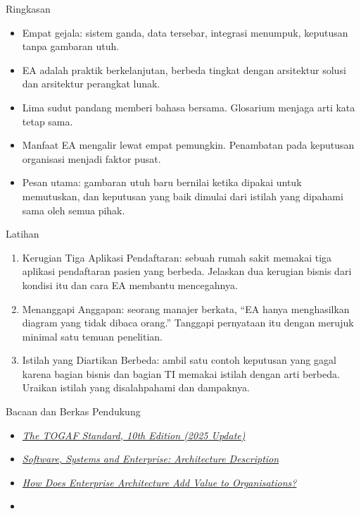 \documentclass[aspectratio=169, table, 12pt]{beamer}
\begin{document}
\begin{frame}{{\Large Ringkasan}}
  \vspace{6pt}
  \small
  \begin{itemize}
    \item Empat gejala: sistem ganda, data tersebar, integrasi menumpuk, keputusan tanpa gambaran utuh.
    \item EA adalah praktik berkelanjutan, berbeda tingkat dengan arsitektur solusi dan arsitektur
          perangkat lunak.
    \item Lima sudut pandang memberi bahasa bersama. Glosarium menjaga arti kata tetap sama.
    \item Manfaat EA mengalir lewat empat pemungkin. Penambatan pada keputusan organisasi menjadi
          faktor pusat.
    \item Pesan utama: gambaran utuh baru bernilai ketika dipakai untuk memutuskan, dan keputusan yang
          baik dimulai dari istilah yang dipahami sama oleh semua pihak.
  \end{itemize}
\end{frame}

\begin{frame}{{\Large Latihan}}
  \vspace{6pt}
  \small
  \begin{enumerate}
    \item Kerugian Tiga Aplikasi Pendaftaran: sebuah rumah sakit memakai tiga aplikasi pendaftaran
          pasien yang berbeda. Jelaskan dua kerugian bisnis dari kondisi itu dan cara EA membantu
          mencegahnya.
    \item Menanggapi Anggapan: seorang manajer berkata, ``EA hanya menghasilkan diagram yang tidak
          dibaca orang.'' Tanggapi pernyataan itu dengan merujuk minimal satu temuan penelitian.
    \item Istilah yang Diartikan Berbeda: ambil satu contoh keputusan yang gagal karena bagian bisnis
          dan bagian TI memakai istilah dengan arti berbeda. Uraikan istilah yang disalahpahami dan
          dampaknya.
  \end{enumerate}
\end{frame}

\begin{frame}{{\Large Bacaan dan Berkas Pendukung}}
  \vspace{10pt}
  \begin{itemize}
    \item \href{https://www.opengroup.org/togaf}{\textit{The TOGAF Standard, 10th Edition (2025 Update)}}
    \item \href{https://www.iso.org/standard/74393.html}{\textit{Software, Systems and Enterprise: Architecture Description}}
    \item \href{https://doi.org/10.17705/1CAIS.02810}{\textit{How Does Enterprise Architecture Add Value to Organisations?}}
    \item {}
  \end{itemize}
\end{frame}
\end{document}
